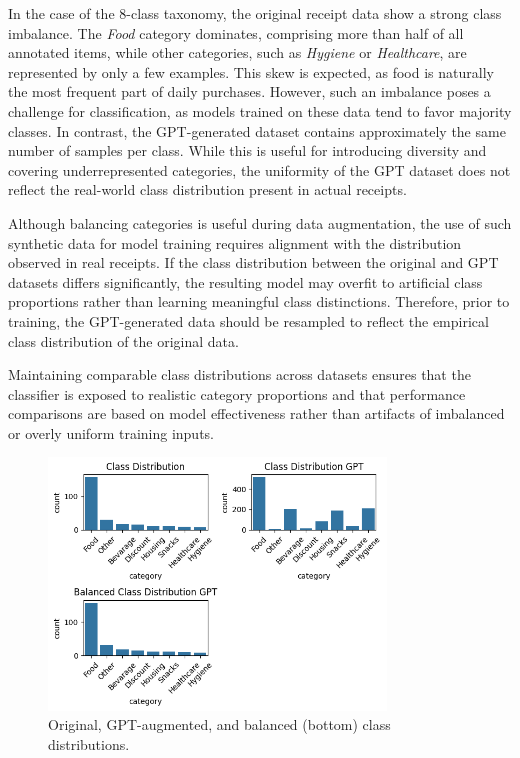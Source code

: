\documentclass{SGGW-thesis-EN}
\begin{document}
In the case of the 8-class taxonomy, the original receipt data show a strong class imbalance. The \emph{Food} category dominates, comprising  
more than half of all annotated items, while other categories, such as \emph{Hygiene} or \emph{Healthcare}, are represented by only a few  
examples. This skew is expected, as food is naturally the most frequent part of daily purchases. However, such an imbalance poses a challenge  
for classification, as models trained on these data tend to favor majority classes. In contrast, the GPT-generated dataset contains  
approximately the same number of samples per class. While this is useful for introducing diversity and covering underrepresented categories,  
the uniformity of the GPT dataset does not reflect the real-world class distribution present in actual receipts.

Although balancing categories is useful during data augmentation, the use of such synthetic data for model training requires alignment with the  
distribution observed in real receipts. If the class distribution between the original and GPT datasets differs significantly, the resulting  
model may overfit to artificial class proportions rather than learning meaningful class distinctions. Therefore, prior to training, the  
GPT-generated data should be resampled to reflect the empirical class distribution of the original data.

Maintaining comparable class distributions across datasets ensures that the classifier is exposed to realistic category proportions and that  
performance comparisons are based on model effectiveness rather than artifacts of imbalanced or overly uniform training inputs.

\begin{figure}[h!]
  \centering
  \includegraphics[width=0.8\textwidth]{images/class_distribution_8classes.png}
  \caption{Original, GPT-augmented, and balanced (bottom) class distributions.}
  \label{fig:dist_8class}
\end{figure}
\end{document}
